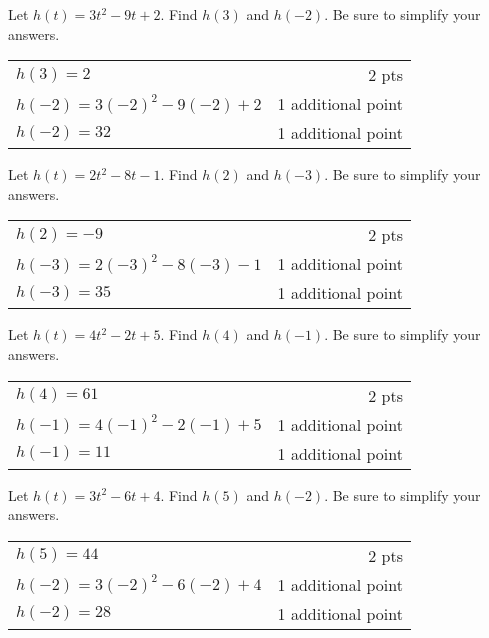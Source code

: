 {
	Let $h(t)=3t^2-9t+2$. Find $h(3)$ and $h(-2).$  Be sure to simplify your answers.
	
}
{
	\begin{tabular}{l r}
	$h(3)=2$ & 2 pts\\
	$h(-2)=3(-2)^2-9(-2)+2$ & 1 additional point\\
	$h(-2)=32$ & 1 additional point
	\end{tabular}
}

{
	Let $h(t)=2t^2-8t-1$. Find  $h(2)$ and  $h(-3).$  Be sure to simplify your answers.
	
}
{
	\begin{tabular}{l r}
	$h(2)=-9$ & 2 pts\\
	$h(-3)=2(-3)^2-8(-3)-1$ & 1 additional point\\
	$h(-3)=35$ & 1 additional point
	\end{tabular}
}

{
	Let $h(t)=4t^2-2t+5$. Find  $h(4)$ and  $h(-1).$  Be sure to simplify your answers.
	
}
{
	\begin{tabular}{l r}
	$h(4)=61$ & 2 pts\\
	$h(-1)=4(-1)^2-2(-1)+5$ & 1 additional point\\
	$h(-1)=11$ & 1 additional point
	\end{tabular}
}

{
	Let $h(t)=3t^2-6t+4$. Find  $h(5)$ and  $h(-2).$  Be sure to simplify your answers.
	
}
{
	\begin{tabular}{l r}
	$h(5)=44$ & 2 pts\\
	$h(-2)=3(-2)^2-6(-2)+4$ & 1 additional point\\
	$h(-2)=28$ & 1 additional point
	\end{tabular}
}